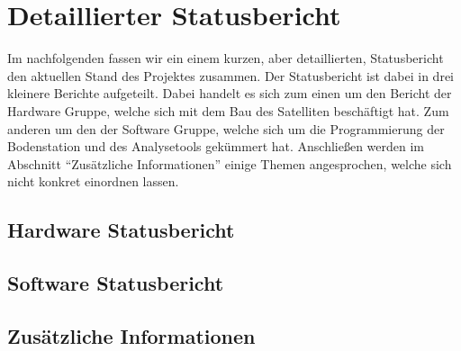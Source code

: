 \section{Detaillierter Statusbericht}
Im nachfolgenden fassen wir ein einem kurzen, aber detaillierten, Statusbericht den aktuellen Stand des Projektes zusammen. Der Statusbericht ist dabei in drei kleinere Berichte aufgeteilt. Dabei handelt es sich zum einen um den Bericht der Hardware Gruppe, welche sich mit dem Bau des Satelliten beschäftigt hat. Zum anderen um den der Software Gruppe, welche sich um die Programmierung der Bodenstation und des Analysetools gekümmert hat. Anschließen werden im Abschnitt ``Zusätzliche Informationen'' einige Themen angesprochen, welche sich nicht konkret einordnen lassen.

\subsection{Hardware Statusbericht}


\subsection{Software Statusbericht}


\subsection{Zusätzliche Informationen}